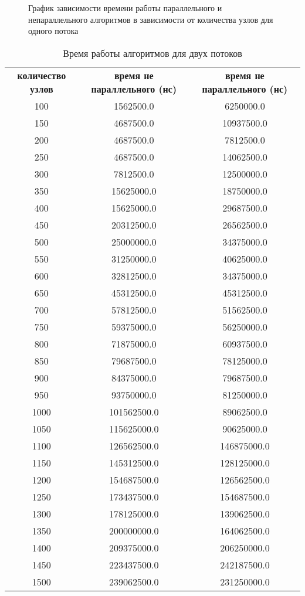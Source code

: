 \begin{figure}[H]
	\caption{График зависимости времени работы параллельного и непараллельного алгоритмов в зависимости от количества узлов для одного потока}
	\label{fig:res_thr_1}
\end{figure}

\begin{table}[H]
  \begin{center}
    \captionsetup{justification=raggedright}
     \caption{Время работы алгоритмов для двух потоков}
    \label{tab:thr_2}
    \begin{tabular}{c|c|c}
      \textbf{количество узлов} & \textbf{время не параллельного (нс)}  & \textbf{время не параллельного (нс)}\\
	100 & 1562500.0 & 6250000.0\\
	150 & 4687500.0 & 10937500.0\\
	200 & 4687500.0 & 7812500.0\\
	250 & 4687500.0 & 14062500.0\\
	300 & 7812500.0 & 12500000.0\\
	350 & 15625000.0 & 18750000.0\\
	400 & 15625000.0 & 29687500.0\\
	450 & 20312500.0 & 26562500.0\\
	500 & 25000000.0 & 34375000.0\\
	550 & 31250000.0 & 40625000.0\\
	600 & 32812500.0 & 34375000.0\\
	650 & 45312500.0 & 45312500.0\\
	700 & 57812500.0 & 51562500.0\\
	750 & 59375000.0 & 56250000.0\\
	800 & 71875000.0 & 60937500.0\\
	850 & 79687500.0 & 78125000.0\\
	900 & 84375000.0 & 79687500.0\\
	950 & 93750000.0 & 81250000.0\\
	1000 & 101562500.0 & 89062500.0\\
	1050 & 115625000.0 & 90625000.0\\
	1100 & 126562500.0 & 146875000.0\\
	1150 & 145312500.0 & 128125000.0\\
	1200 & 154687500.0 & 126562500.0\\
	1250 & 173437500.0 & 154687500.0\\
	1300 & 178125000.0 & 139062500.0\\
	1350 & 200000000.0 & 164062500.0\\
	1400 & 209375000.0 & 206250000.0\\
	1450 & 223437500.0 & 242187500.0\\
	1500 & 239062500.0 & 231250000.0\\
      \hline	
    \end{tabular}
  \end{center}
\end{table}

